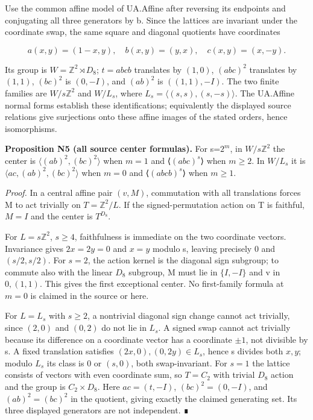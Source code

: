 Use the common affine model of UA.Affine after reversing its endpoints and conjugating all three generators by b. Since the lattices are invariant under the coordinate swap, the same square and diagonal quotients have coordinates

\[
a(x,y)=(1-x,y),\quad b(x,y)=(y,x),\quad c(x,y)=(x,-y).
\tag{N5}
\]

Its group is \(W=\mathbb Z^{2}\rtimes D_{8}\); \(t=abcb\) translates by \((1,0)\), \((abc)^{2}\) translates by \((1,1)\), \((bc)^{2}\) is \((0,-I)\), and \((ab)^{2}\) is \(((1,1),-I)\). The two finite families are \(W/s\mathbb Z^{2}\) and \(W/L_s\), where \(L_s=\langle (s,s),(s,-s)\rangle\). The UA.Affine normal forms establish these identifications; equivalently the displayed source relations give surjections onto these affine images of the stated orders, hence isomorphisms.

\textbf{Proposition N5 (all source center formulas).} For s=\(2^{m}\), in \(W/s\mathbb Z^{2}\) the center is \(\langle (ab)^{2},(bc)^{2}\rangle\) when \(m=1\) and ⟨\((abc)^{s}\)⟩ when \(m\ge 2\). In \(W/L_s\) it is \(\langle ac,(ab)^{2},(bc)^{2}\rangle\) when \(m=0\) and ⟨\((abcb)^{s}\)⟩ when \(m\ge 1\).

\emph{Proof.} In a central affine pair \((v,M)\), commutation with all translations forces M to act trivially on \(T=\mathbb Z^{2}/L\). If the signed-permutation action on T is faithful, \(M=I\) and the center is \(T^{D_8}\).

For \(L=s\mathbb Z^{2}\), \(s\ge 4\), faithfulness is immediate on the two coordinate vectors. Invariance gives \(2x=2y=0\) and \(x=y\) modulo s, leaving precisely 0 and \((s/2,s/2)\). For \(s=2\), the action kernel is the diagonal sign subgroup; to commute also with the linear \(D_{8}\) subgroup, M must lie in \(\{I,-I\}\) and v in \({0,(1,1)}\). This gives the first exceptional center. No first-family formula at \(m=0\) is claimed in the source or here.

For \(L=L_s\) with \(s\ge 2\), a nontrivial diagonal sign change cannot act trivially, since \((2,0)\) and \((0,2)\) do not lie in \(L_s\). A signed swap cannot act trivially because its difference on a coordinate vector has a coordinate \(\pm 1\), not divisible by s. A fixed translation satisfies \((2x,0),(0,2y)\in L_s\), hence s divides both \(x,y\); modulo \(L_s\) its class is 0 or \((s,0)\), both swap-invariant. For \(s=1\) the lattice consists of vectors with even coordinate sum, so \(T=C_{2}\) with trivial \(D_{8}\) action and the group is \(C_{2}\times D_{8}\). Here \(ac=(t,-I)\), \((bc)^{2}=(0,-I)\), and \((ab)^{2}=(bc)^{2}\) in the quotient, giving exactly the claimed generating set. Its three displayed generators are not independent. ∎

